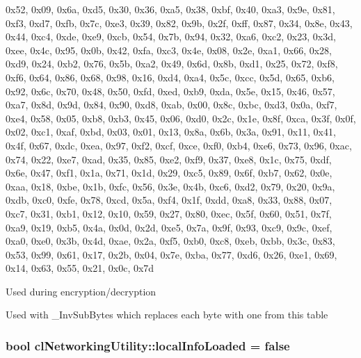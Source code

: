 \begin{DoxyCode}

        {
                0x52, 0x09, 0x6a, 0xd5, 0x30, 0x36, 0xa5, 0x38, 0xbf, 0x40, 0xa3,
       0x9e, 0x81, 0xf3, 0xd7, 0xfb,
                0x7c, 0xe3, 0x39, 0x82, 0x9b, 0x2f, 0xff, 0x87, 0x34, 0x8e, 0x43,
       0x44, 0xc4, 0xde, 0xe9, 0xcb,
                0x54, 0x7b, 0x94, 0x32, 0xa6, 0xc2, 0x23, 0x3d, 0xee, 0x4c, 0x95,
       0x0b, 0x42, 0xfa, 0xc3, 0x4e,
                0x08, 0x2e, 0xa1, 0x66, 0x28, 0xd9, 0x24, 0xb2, 0x76, 0x5b, 0xa2,
       0x49, 0x6d, 0x8b, 0xd1, 0x25,
                0x72, 0xf8, 0xf6, 0x64, 0x86, 0x68, 0x98, 0x16, 0xd4, 0xa4, 0x5c,
       0xcc, 0x5d, 0x65, 0xb6, 0x92,
                0x6c, 0x70, 0x48, 0x50, 0xfd, 0xed, 0xb9, 0xda, 0x5e, 0x15, 0x46,
       0x57, 0xa7, 0x8d, 0x9d, 0x84,
                0x90, 0xd8, 0xab, 0x00, 0x8c, 0xbc, 0xd3, 0x0a, 0xf7, 0xe4, 0x58,
       0x05, 0xb8, 0xb3, 0x45, 0x06,
                0xd0, 0x2c, 0x1e, 0x8f, 0xca, 0x3f, 0x0f, 0x02, 0xc1, 0xaf, 0xbd,
       0x03, 0x01, 0x13, 0x8a, 0x6b,
                0x3a, 0x91, 0x11, 0x41, 0x4f, 0x67, 0xdc, 0xea, 0x97, 0xf2, 0xcf,
       0xce, 0xf0, 0xb4, 0xe6, 0x73,
                0x96, 0xac, 0x74, 0x22, 0xe7, 0xad, 0x35, 0x85, 0xe2, 0xf9, 0x37,
       0xe8, 0x1c, 0x75, 0xdf, 0x6e,
                0x47, 0xf1, 0x1a, 0x71, 0x1d, 0x29, 0xc5, 0x89, 0x6f, 0xb7, 0x62,
       0x0e, 0xaa, 0x18, 0xbe, 0x1b,
                0xfc, 0x56, 0x3e, 0x4b, 0xc6, 0xd2, 0x79, 0x20, 0x9a, 0xdb, 0xc0,
       0xfe, 0x78, 0xcd, 0x5a, 0xf4,
                0x1f, 0xdd, 0xa8, 0x33, 0x88, 0x07, 0xc7, 0x31, 0xb1, 0x12, 0x10,
       0x59, 0x27, 0x80, 0xec, 0x5f,
                0x60, 0x51, 0x7f, 0xa9, 0x19, 0xb5, 0x4a, 0x0d, 0x2d, 0xe5, 0x7a,
       0x9f, 0x93, 0xc9, 0x9c, 0xef,
                0xa0, 0xe0, 0x3b, 0x4d, 0xae, 0x2a, 0xf5, 0xb0, 0xc8, 0xeb, 0xbb,
       0x3c, 0x83, 0x53, 0x99, 0x61,
                0x17, 0x2b, 0x04, 0x7e, 0xba, 0x77, 0xd6, 0x26, 0xe1, 0x69, 0x14,
       0x63, 0x55, 0x21, 0x0c, 0x7d
        }
\end{DoxyCode}
Used during encryption/decryption \par
 Used with \_\-InvSubBytes which replaces each byte with one from this table \hypertarget{classcl_networking_utility_a766d28dd514254451214cb339c6d009b}{
\subsubsection[{localInfoLoaded}]{\setlength{\rightskip}{0pt plus 5cm}bool {\bf clNetworkingUtility::localInfoLoaded} = false}}
